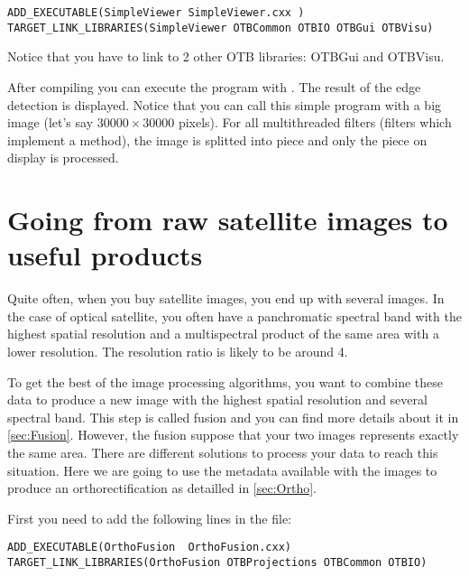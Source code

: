 \begin{small}
\begin{verbatim}
ADD_EXECUTABLE(SimpleViewer SimpleViewer.cxx )
TARGET_LINK_LIBRARIES(SimpleViewer OTBCommon OTBIO OTBGui OTBVisu)
\end{verbatim}
\end{small}

Notice that you have to link to 2 other OTB libraries: OTBGui and OTBVisu.



After compiling you can execute the program with . The result of the edge detection is displayed. Notice that you
can call this simple program with a big image (let's say $30000 \times 30000$
pixels). For all multithreaded filters (filters which implement a
 method), the image is splitted into piece and only
the piece on display is processed.

\section{Going from raw satellite images to useful products}

Quite often, when you buy satellite images, you end up with several images. In the case of optical satellite, you often have a panchromatic spectral band with the highest spatial resolution and a multispectral product of the same area with a lower resolution. The resolution ratio is likely to be around 4.

To get the best of the image processing algorithms, you want to combine these data to produce a new image with the highest spatial resolution and several spectral band. This step is called fusion and you can find more details about it in \ref{sec:Fusion}. However, the fusion suppose that your two images represents exactly the same area. There are different solutions to process your data to reach this situation. Here we are going to use the metadata available with the images to produce an orthorectification as detailled in \ref{sec:Ortho}.

First you need to add the following lines in the  file:

\begin{small}
\begin{verbatim}
ADD_EXECUTABLE(OrthoFusion  OrthoFusion.cxx)
TARGET_LINK_LIBRARIES(OrthoFusion OTBProjections OTBCommon OTBIO)
\end{verbatim}
\end{small}





%
%
%



